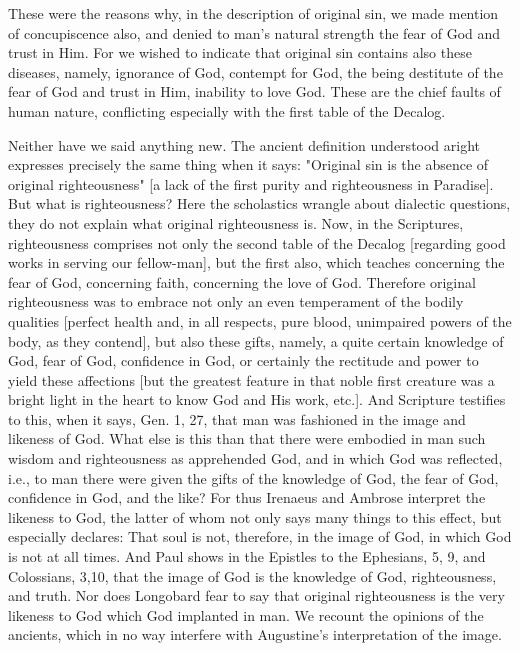 These were the reasons why, in the description of original sin, we
made mention of concupiscence also, and denied to man's natural
strength the fear of God and trust in Him.  For we wished to indicate
that original sin contains also these diseases, namely, ignorance of
God, contempt for God, the being destitute of the fear of God and
trust in Him, inability to love God.  These are the chief faults of
human nature, conflicting especially with the first table of the
Decalog.

Neither have we said anything new.  The ancient definition understood
aright expresses precisely the same thing when it says: "Original sin
is the absence of original righteousness" [a lack of the first purity
and righteousness in Paradise].  But what is righteousness?  Here the
scholastics wrangle about dialectic questions, they do not explain
what original righteousness is.  Now, in the Scriptures,
righteousness comprises not only the second table of the Decalog
[regarding good works in serving our fellow-man], but the first also,
which teaches concerning the fear of God, concerning faith,
concerning the love of God.  Therefore original righteousness was to
embrace not only an even temperament of the bodily qualities [perfect
health and, in all respects, pure blood, unimpaired powers of the
body, as they contend], but also these gifts, namely, a quite certain
knowledge of God, fear of God, confidence in God, or certainly the
rectitude and power to yield these affections [but the greatest
feature in that noble first creature was a bright light in the heart
to know God and His work, etc.].  And Scripture testifies to this,
when it says, Gen. 1, 27, that man was fashioned in the image and
likeness of God.  What else is this than that there were embodied in
man such wisdom and righteousness as apprehended God, and in which
God was reflected, i.e., to man there were given the gifts of the
knowledge of God, the fear of God, confidence in God, and the like?
For thus Irenaeus and Ambrose interpret the likeness to God, the
latter of whom not only says many things to this effect, but
especially declares: That soul is not, therefore, in the image of God,
in which God is not at all times.  And Paul shows in the Epistles to
the Ephesians, 5, 9, and Colossians, 3,10, that the image of God is
the knowledge of God, righteousness, and truth.  Nor does Longobard
fear to say that original righteousness is the very likeness to God
which God implanted in man.  We recount the opinions of the ancients,
which in no way interfere with Augustine's interpretation of the
image.

